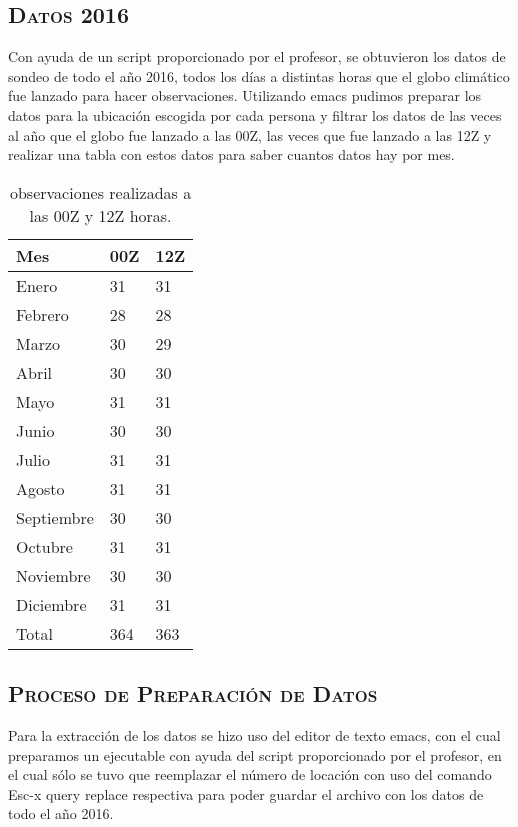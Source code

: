 \documentclass[12pt]{article}
\begin{document}
\subsection{\textsc{Datos 2016}}
Con ayuda de un script proporcionado por el profesor, se obtuvieron los datos de sondeo de todo el año 2016, todos los días a distintas horas que el globo climático fue lanzado para hacer observaciones. Utilizando emacs pudimos preparar los datos para la ubicación escogida por cada persona y filtrar los datos de las veces al año que el globo fue lanzado a las 00Z, las veces que fue lanzado a las 12Z y realizar una tabla con estos datos para saber cuantos datos hay por mes. 

\begin{table}[htbp]
\begin{center}
\begin{tabular}{|l|l|l|}
\hline \hline
Mes & 00Z & 12Z   \\
\hline \hline
Enero & 31 & 31  \\ \hline
Febrero & 28 & 28  \\ \hline
Marzo & 30 & 29 \\ \hline
Abril & 30 & 30 \\ \hline
Mayo & 31 & 31 \\ \hline
Junio & 30 & 30 \\ \hline
Julio & 31 & 31 \\ \hline
Agosto & 31 & 31 \\ \hline
Septiembre & 30 & 30 \\ \hline
Octubre & 31 & 31 \\ \hline
Noviembre & 30 & 30 \\ \hline
Diciembre & 31 & 31 \\ \hline
Total & 364 & 363 \\ \hline
\end{tabular}
\caption{observaciones realizadas a las 00Z y 12Z horas.}
\label{tabla:sencilla}
\end{center}
\end{table}

\subsection{\textsc{Proceso de Preparación de Datos}}
Para la extracción de los datos se hizo uso del editor de texto emacs, con el cual preparamos un ejecutable con ayuda del script proporcionado por el profesor, en el cual sólo se tuvo que reemplazar el número de locación con uso del comando Esc-x query replace respectiva para poder guardar el archivo con los datos de todo el año 2016. \\
\end{document}
